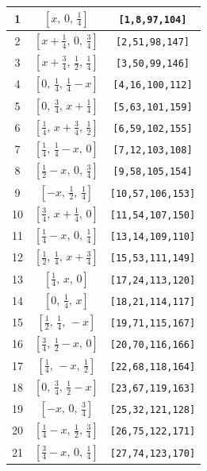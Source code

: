 \documentclass[fleqn,8pt]{jsarticle}
\begin{document}
\begin{longtable}{ccc}
1 & $\left[ x,\, 0,\, \frac{1}{4} \right]$ & {\tt [1,8,97,104]} \\ \hline
2 & $\left[ x + \frac{1}{4},\, 0,\, \frac{3}{4} \right]$ & {\tt [2,51,98,147]} \\ \hline
3 & $\left[ x + \frac{3}{4},\, \frac{1}{2},\, \frac{1}{4} \right]$ & {\tt [3,50,99,146]} \\ \hline
4 & $\left[ 0,\, \frac{1}{4},\, \frac{1}{4} - x \right]$ & {\tt [4,16,100,112]} \\ \hline
5 & $\left[ 0,\, \frac{3}{4},\, x + \frac{1}{4} \right]$ & {\tt [5,63,101,159]} \\ \hline
6 & $\left[ \frac{1}{4},\, x + \frac{3}{4},\, \frac{1}{2} \right]$ & {\tt [6,59,102,155]} \\ \hline
7 & $\left[ \frac{1}{4},\, \frac{1}{4} - x,\, 0 \right]$ & {\tt [7,12,103,108]} \\ \hline
8 & $\left[ \frac{1}{2} - x,\, 0,\, \frac{3}{4} \right]$ & {\tt [9,58,105,154]} \\ \hline
9 & $\left[ - x,\, \frac{1}{2},\, \frac{1}{4} \right]$ & {\tt [10,57,106,153]} \\ \hline
10 & $\left[ \frac{3}{4},\, x + \frac{1}{4},\, 0 \right]$ & {\tt [11,54,107,150]} \\ \hline
11 & $\left[ \frac{1}{4} - x,\, 0,\, \frac{1}{4} \right]$ & {\tt [13,14,109,110]} \\ \hline
12 & $\left[ \frac{1}{2},\, \frac{1}{4},\, x + \frac{3}{4} \right]$ & {\tt [15,53,111,149]} \\ \hline
13 & $\left[ \frac{1}{4},\, x,\, 0 \right]$ & {\tt [17,24,113,120]} \\ \hline
14 & $\left[ 0,\, \frac{1}{4},\, x \right]$ & {\tt [18,21,114,117]} \\ \hline
15 & $\left[ \frac{1}{2},\, \frac{1}{4},\, - x \right]$ & {\tt [19,71,115,167]} \\ \hline
16 & $\left[ \frac{3}{4},\, \frac{1}{2} - x,\, 0 \right]$ & {\tt [20,70,116,166]} \\ \hline
17 & $\left[ \frac{1}{4},\, - x,\, \frac{1}{2} \right]$ & {\tt [22,68,118,164]} \\ \hline
18 & $\left[ 0,\, \frac{3}{4},\, \frac{1}{2} - x \right]$ & {\tt [23,67,119,163]} \\ \hline
19 & $\left[ - x,\, 0,\, \frac{3}{4} \right]$ & {\tt [25,32,121,128]} \\ \hline
20 & $\left[ \frac{1}{4} - x,\, \frac{1}{2},\, \frac{3}{4} \right]$ & {\tt [26,75,122,171]} \\ \hline
21 & $\left[ \frac{3}{4} - x,\, 0,\, \frac{1}{4} \right]$ & {\tt [27,74,123,170]} \\ \hline

\end{longtable}
\end{document}
